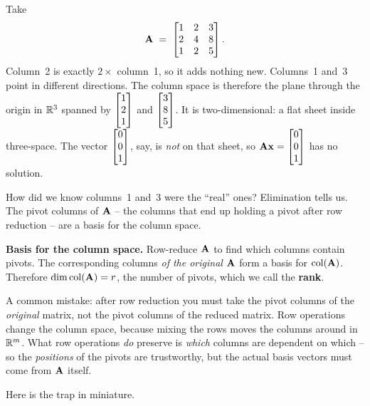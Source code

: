 \begin{example}\label{ch15:colspace-rank2}
Take
\[
  \mathbf{A} \;=\;
  \begin{bmatrix} 1 & 2 & 3\\ 2 & 4 & 8\\ 1 & 2 & 5 \end{bmatrix}.
\]
Column~2 is exactly $2\times$ column~1, so it adds nothing new. Columns~1 and~3 point in
different directions. The column space is therefore the plane through the origin in $\mathbb{R}^3$ spanned by
$\begin{bmatrix}1\\2\\1\end{bmatrix}$ and $\begin{bmatrix}3\\8\\5\end{bmatrix}$. It is two-dimensional: a flat sheet inside three-space.
The vector $\begin{bmatrix}0\\0\\1\end{bmatrix}$, say, is \emph{not} on that sheet, so $\mathbf{A}\mathbf{x}=\begin{bmatrix}0\\0\\1\end{bmatrix}$
has no solution.
\end{example}

How did we know columns~1 and~3 were the ``real'' ones? Elimination tells us. The pivot columns
of $\mathbf{A}$ -- the columns that end up holding a pivot after row reduction -- are a basis for the
column space.

\begin{formalbox}
\textbf{Basis for the column space.} Row-reduce $\mathbf{A}$ to find which columns contain pivots.
The corresponding columns \emph{of the original $\mathbf{A}$} form a basis for $\operatorname{col}(\mathbf{A})$.
Therefore $\operatorname{dim} \operatorname{col}(\mathbf{A}) = r$, the number of pivots, which we call the \textbf{rank}.
\end{formalbox}

\begin{trapbox}
A common mistake: after row reduction you must take the pivot columns of the
\emph{original} matrix, not the pivot columns of the reduced matrix. Row operations change the
column space, because mixing the rows moves the columns around in $\mathbb{R}^m$. What row operations
\emph{do} preserve is \emph{which} columns are dependent on which -- so the \emph{positions} of the
pivots are trustworthy, but the actual basis vectors must come from $\mathbf{A}$ itself.
\end{trapbox}

Here is the trap in miniature.

